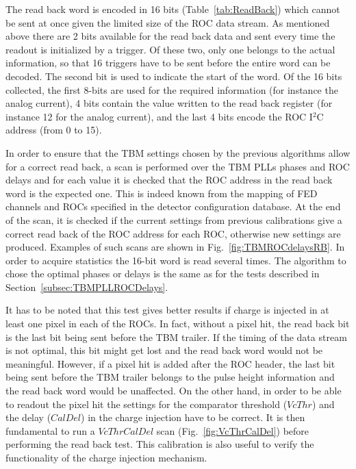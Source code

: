 The read back word is encoded in 16 bits (Table~\ref{tab:ReadBack}) which cannot be sent at once given the limited size of the ROC data stream.
As mentioned above there are 2 bits available for the read back data and sent every time the readout is initialized by a trigger.
Of these two, only one belongs to the actual information, so that 16 triggers have to be sent before the entire word can be decoded.
The second bit is used to indicate the start of the word.
Of the 16 bits collected, the first 8-bits are used for the required information (for instance the analog current),
4 bits contain the value written to the read back register (for instance 12 for the analog current),
and the last 4 bits encode the ROC I$^2$C address (from 0 to 15).

In order to ensure that the TBM settings chosen by the previous algorithms allow for a correct read back,
a scan is performed over the TBM PLLs phases and ROC delays
and for each value it is checked that the ROC address in the read back word is the expected one.
This is indeed known from the mapping of FED channels and ROCs specified in the detector configuration database.
At the end of the scan, it is checked if the current settings from previous calibrations give a correct read back of the ROC address for each ROC, otherwise new settings are produced.
Examples of such scans are shown in Fig.~\ref{fig:TBMROCdelaysRB}.
In order to acquire statistics the 16-bit word is read several times.
The algorithm to chose the optimal phases or delays is the same as for the tests described in Section~\ref{subsec:TBMPLLROCDelays}.

It has to be noted that this test gives better results if charge is injected in at least one pixel in each of the ROCs.
In fact, without a pixel hit, the read back bit is the last bit being sent before the TBM trailer.
If the timing of the data stream is not optimal, this bit might get lost and the read back word would not be meaningful.
However, if a pixel hit is added after the ROC header, the last bit being sent before the TBM trailer belongs to the pulse height information and the read back word would be unaffected.
On the other hand, in order to be able to readout the pixel hit the settings for the comparator threshold ($VcThr$) and the delay ($CalDel$) in the charge injection have to be correct.
It is then fundamental to run a $VcThrCalDel$ scan (Fig.~\ref{fig:VcThrCalDel}) before performing the read back test.
This calibration is also useful to verify the functionality of the charge injection mechanism.


